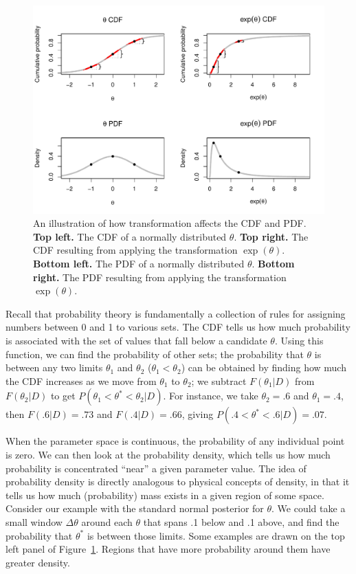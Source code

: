 \documentclass[9pt,twocolumn,twoside]{cidlab-draft}\templatetype{cidlab-invited}
\begin{document}
\begin{figure}[t]
    \centering
    \includegraphics[width=.85\textwidth]{idunno.pdf}
    \caption{An illustration of how transformation affects the CDF and PDF. \textbf{Top left.} The CDF of a normally distributed $\theta$. \textbf{Top right.} The CDF resulting from applying the transformation $\exp(\theta)$. \textbf{Bottom left.} The PDF of a normally distributed $\theta$. \textbf{Bottom right.} The PDF resulting from applying the transformation $\exp(\theta)$.}
    \label{fig:normals}
\end{figure}

Recall that probability theory is fundamentally a collection of rules for assigning numbers between 0 and 1 to various sets. The CDF tells us how much probability is associated with the set of values that fall below a candidate $\theta$. Using this function, we can find the probability of other sets; the probability that $\theta$ is between any two limits $\theta_1$ and $\theta_2$ ($\theta_1<\theta_2$) can be obtained by finding how much the CDF increases as we move from $\theta_1$ to $\theta_2$; we subtract $F(\theta_1|D)$ from $F(\theta_2|D)$ to get $P(\theta_1<\theta^*<\theta_2|D)$. For instance, we take $\theta_2=.6$ and $\theta_1=.4$, then $F(.6|D)=.73$ and $F(.4|D)=.66$, giving $P(.4<\theta^*<.6|D)=.07$. 

When the parameter space is continuous, the probability of any individual point is zero. We can then look at the probability density, which tells us how much probability is concentrated ``near'' a given parameter value. The idea of probability density is directly analogous to physical concepts of density, in that it tells us how much (probability) mass exists in a given region of some space. Consider our example with the standard normal posterior for $\theta$. We could take a small window $\Delta \theta$ around each $\theta$ that spans .1 below and .1 above, and find the probability that $\theta^*$ is between those limits. Some examples are drawn on the top left panel of Figure~\ref{fig:normals}.
Regions that have more probability around them have greater density.
\end{document}
